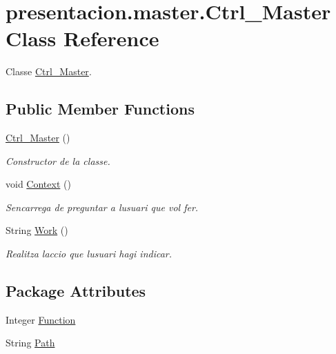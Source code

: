 \hypertarget{classpresentacion_1_1master_1_1Ctrl__Master}{}\section{presentacion.\+master.\+Ctrl\+\_\+\+Master Class Reference}
\label{classpresentacion_1_1master_1_1Ctrl__Master}


Classe \hyperlink{classpresentacion_1_1master_1_1Ctrl__Master}{Ctrl\+\_\+\+Master}.  


\subsection*{Public Member Functions}
\begin{DoxyCompactItemize}
\item 
\hyperlink{classpresentacion_1_1master_1_1Ctrl__Master_a7336c36d767f4eb13e75761b67de17c4}{Ctrl\+\_\+\+Master} ()
\begin{DoxyCompactList}\small\item\em Constructor de la classe. \end{DoxyCompactList}\item 
void \hyperlink{classpresentacion_1_1master_1_1Ctrl__Master_adf19ba4025da7654d5e7c01d9f5650c1}{Context} ()
\begin{DoxyCompactList}\small\item\em S\textquotesingle{}encarrega de preguntar a l\textquotesingle{}usuari que vol fer. \end{DoxyCompactList}\item 
String \hyperlink{classpresentacion_1_1master_1_1Ctrl__Master_aa25099e202de5e076b950e4e3bf5c26b}{Work} ()
\begin{DoxyCompactList}\small\item\em Realitza l\textquotesingle{}accio que l\textquotesingle{}usuari hagi indicar. \end{DoxyCompactList}\end{DoxyCompactItemize}
\subsection*{Package Attributes}
\begin{DoxyCompactItemize}
\item 
Integer \hyperlink{classpresentacion_1_1master_1_1Ctrl__Master_a5358a65f5f7bc39f860af1d858739d41}{Function}
\item 
String \hyperlink{classpresentacion_1_1master_1_1Ctrl__Master_a3d2cb29ead7034fa79496fca2da0157a}{Path}
\end{DoxyCompactItemize}


